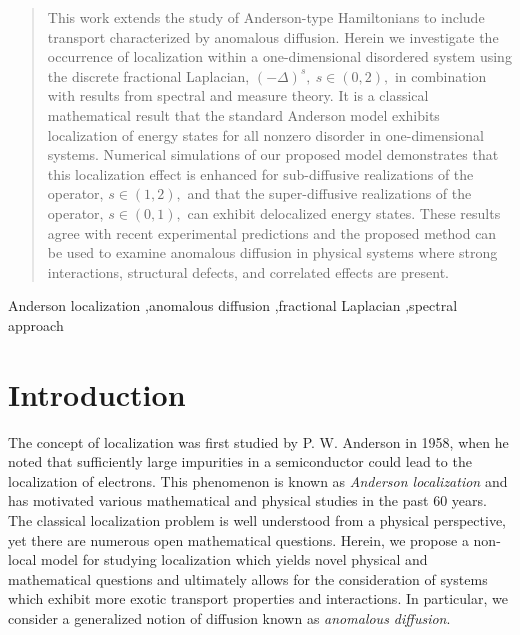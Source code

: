 \documentclass[final,1p,times]{elsarticle}
\theoremstyle{remark}
\theoremstyle{definition}
\newcommand{\josh}[1]{\textcolor{red}{\textbf{#1}}}
\begin{document}
\begin{frontmatter}
\begin{abstract}
This work extends the study of Anderson-type Hamiltonians to include transport characterized by anomalous diffusion. 
Herein we investigate the occurrence of localization within a one-dimensional disordered system using the discrete fractional Laplacian, $(-\Delta)^s,\ s\in(0,2),$ in combination with results from spectral and measure theory.
It is a classical mathematical result that the standard Anderson model exhibits localization of energy states for all nonzero disorder in one-dimensional systems. Numerical simulations of our proposed model demonstrates that this localization effect is enhanced for sub-diffusive realizations of the operator, $s\in (1,2),$ and that the super-diffusive realizations of the operator, $s\in (0,1),$ can exhibit delocalized energy states. These results agree with recent experimental predictions and the proposed method can be used to examine anomalous diffusion in physical systems where strong interactions, structural defects, and correlated effects are present. 
\end{abstract}

\begin{keyword} 
Anderson localization \sep anomalous diffusion \sep fractional Laplacian \sep spectral approach
\end{keyword}

\end{frontmatter}



\section{Introduction} 


The concept of localization was first studied by P. W. Anderson in 1958, when he noted that sufficiently large impurities in a semiconductor could lead to the localization of electrons. This phenomenon is known as {\em Anderson localization} and has motivated various mathematical and physical studies in the past 60 years. The classical localization problem is well understood from a physical perspective, yet there are numerous open mathematical questions. Herein, we propose a non-local model for studying localization which yields novel physical and mathematical questions and ultimately allows for the consideration of systems which exhibit more exotic transport properties and interactions. In particular, we consider a generalized notion of diffusion known as {\em anomalous diffusion}.
\end{document}

